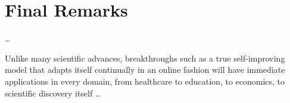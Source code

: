 \documentclass[../main.tex]{subfiles}
\begin{document}
    



    \section{Final Remarks} \label{conclusions:final_remarks} 
    
    \dots

    Unlike many scientific advances, breakthroughs such as a true self-improving model that adapts itself continually in an online fashion will have immediate applications in every domain, from healthcare to education, to economics, to scientific discovery itself \dots 

\end{document}
